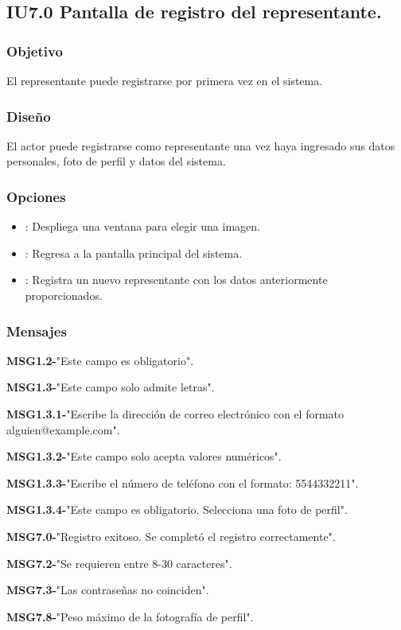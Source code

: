 \subsection{IU7.0 Pantalla de registro del representante.}

\subsubsection{Objetivo}
	El representante puede registrarse por primera vez en el sistema.

\subsubsection{Diseño}
  El actor puede registrarse como representante una vez haya ingresado sus datos personales, foto de perfil y datos del sistema.


\subsubsection{Opciones}
\begin{itemize}
	\item {}: Despliega una ventana para elegir una imagen.
	\item {}: Regresa a la pantalla principal del sistema.
	\item {}: Registra un nuevo representante con los datos anteriormente proporcionados.
\end{itemize}

\subsubsection{Mensajes}
	\begin{Citemize}
		\item {\bf MSG1.2-}"Este campo es obligatorio".
		\item {\bf MSG1.3-}"Este campo solo admite letras".
		\item {\bf MSG1.3.1-}"Escribe la dirección de correo electrónico con el formato alguien@example.com".
		\item {\bf MSG1.3.2-}"Este campo solo acepta valores numéricos".
		\item {\bf MSG1.3.3-}"Escribe el número de teléfono con el formato: 5544332211".
		\item {\bf MSG1.3.4-}"Este campo es obligatorio. Selecciona una foto de perfil".
		\item {\bf MSG7.0-}"Registro exitoso. Se completó el registro correctamente".
		\item {\bf MSG7.2-}"Se requieren entre 8-30 caracteres".
		\item {\bf MSG7.3-}"Las contraseñas no coinciden".
		\item {\bf MSG7.8-}"Peso máximo de la fotografía de perfil".
	\end{Citemize}